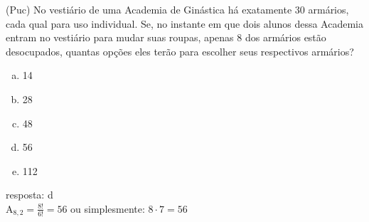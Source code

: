 \begin{ex}
   (Puc) No vestiário de uma Academia de Ginástica há exatamente 30 armários, cada qual para uso individual. Se, no instante em que dois alunos dessa Academia entram no vestiário para mudar suas roupas, apenas 8 dos armários estão desocupados, quantas opções eles terão para escolher seus respectivos armários? 
     \begin{enumerate} [(a)]
         \item 14
         \item 28
         \item 48
         \item 56
         \item 112
     \end{enumerate}
     \begin{sol}
     resposta: d \\
     $\mathrm{A}_{8,2}=\frac{8!}{6!}=56$ ou simplesmente: $8\cdot7=56$
     \end{sol}
 \end{ex}